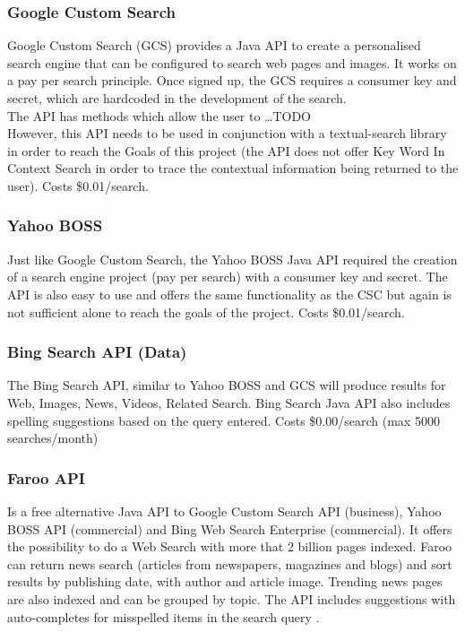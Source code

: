\documentclass[10pt]{article}
\begin{document}
\subsubsection{Google Custom Search}
Google Custom Search (GCS) provides a Java API to create a personalised search engine that can be configured to search web pages and images. It works on a pay per search principle. Once signed up, the GCS requires a consumer key and secret, which are hardcoded in the development of the search.\\
The API has methods which allow the user to …TODO\\
However, this API needs to be used in conjunction with a textual-search library in order to reach the Goals of this project (the API does not offer Key Word In Context Search in order to trace the contextual information being returned to the user). Costs \$0.01/search.

\subsubsection{Yahoo BOSS}
Just like Google Custom Search, the Yahoo BOSS Java API required the creation of a search engine project (pay per search) with a consumer key and secret. The API is also easy to use and offers the same functionality as the CSC but again is not sufficient alone to reach the goals of the project. Costs \$0.01/search.

\subsubsection{Bing Search API (Data)}
The Bing Search API, similar to Yahoo BOSS and GCS will produce results for Web, Images, News, Videos, Related Search. Bing Search Java API also includes spelling suggestions based on the query entered. Costs \$0.00/search (max 5000 searches/month)

\subsubsection{Faroo API}
Is a free alternative Java API to Google Custom Search API (business), Yahoo BOSS API  (commercial) and Bing Web Search Enterprise (commercial). It offers the possibility to do a Web Search with more that 2 billion pages indexed. Faroo can return news search (articles from newspapers, magazines and blogs) and sort results by publishing date, with author and article image. Trending news pages are also indexed and can be grouped by topic. The API includes suggestions with auto-completes for misspelled items in the search query \cite{faroo}.
\end{document}
